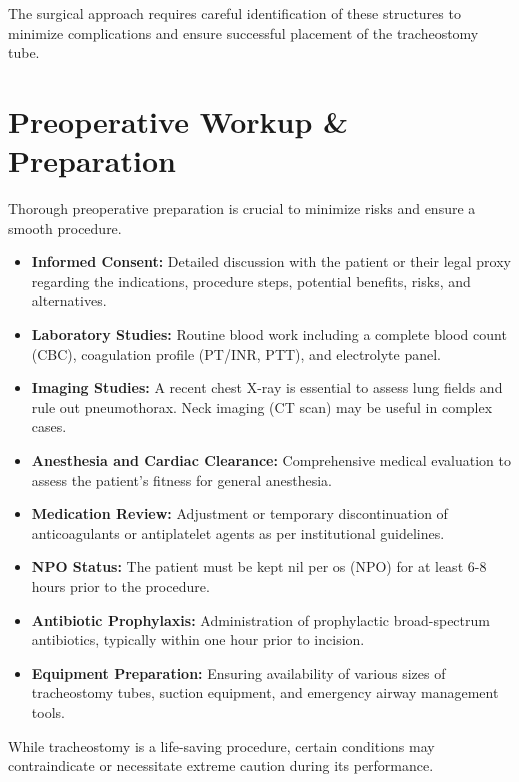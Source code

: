 The surgical approach requires careful identification of these structures to minimize complications and ensure successful placement of the tracheostomy tube.

\section*{Preoperative Workup \& Preparation}
Thorough preoperative preparation is crucial to minimize risks and ensure a smooth procedure.

\begin{itemize}
  \item \textbf{Informed Consent:} Detailed discussion with the patient or their legal proxy regarding the indications, procedure steps, potential benefits, risks, and alternatives.

  \item \textbf{Laboratory Studies:} Routine blood work including a complete blood count (CBC), coagulation profile (PT/INR, PTT), and electrolyte panel.

  \item \textbf{Imaging Studies:} A recent chest X-ray is essential to assess lung fields and rule out pneumothorax. Neck imaging (CT scan) may be useful in complex cases.

  \item \textbf{Anesthesia and Cardiac Clearance:} Comprehensive medical evaluation to assess the patient's fitness for general anesthesia.

  \item \textbf{Medication Review:} Adjustment or temporary discontinuation of anticoagulants or antiplatelet agents as per institutional guidelines.

  \item \textbf{NPO Status:} The patient must be kept nil per os (NPO) for at least 6-8 hours prior to the procedure.

  \item \textbf{Antibiotic Prophylaxis:} Administration of prophylactic broad-spectrum antibiotics, typically within one hour prior to incision.

  \item \textbf{Equipment Preparation:} Ensuring availability of various sizes of tracheostomy tubes, suction equipment, and emergency airway management tools.
\end{itemize}

While tracheostomy is a life-saving procedure, certain conditions may contraindicate or necessitate extreme caution during its performance.

